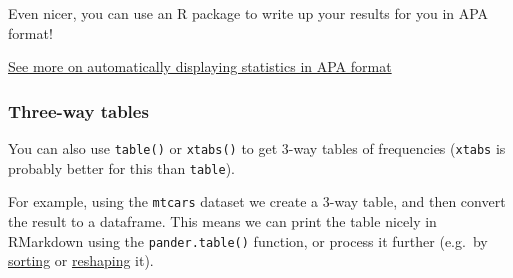 \documentclass[]{article}
\newenvironment{Shaded}{\begin{snugshade}}{\end{snugshade}}
\newcommand{\CharTok}[1]{\textcolor[rgb]{0.31,0.60,0.02}{#1}}
\newcommand{\DataTypeTok}[1]{\textcolor[rgb]{0.13,0.29,0.53}{#1}}
\newcommand{\DecValTok}[1]{\textcolor[rgb]{0.00,0.00,0.81}{#1}}
\newcommand{\KeywordTok}[1]{\textcolor[rgb]{0.13,0.29,0.53}{\textbf{#1}}}
\newcommand{\NormalTok}[1]{#1}
\newcommand{\OperatorTok}[1]{\textcolor[rgb]{0.81,0.36,0.00}{\textbf{#1}}}
\newcommand{\StringTok}[1]{\textcolor[rgb]{0.31,0.60,0.02}{#1}}
\begin{document}
Even nicer, you can use an R package to write up your results for you in APA
format!

\begin{Shaded}
\end{Shaded}

\protect\hyperlink{apa-output}{See more on automatically displaying statistics in APA format}

\hypertarget{three-way-tables}{%
\subsubsection*{Three-way tables}\label{three-way-tables}}

You can also use \texttt{table()} or \texttt{xtabs()} to get 3-way tables of frequencies
(\texttt{xtabs} is probably better for this than \texttt{table}).

For example, using the \texttt{mtcars} dataset we create a 3-way table, and then
convert the result to a dataframe. This means we can print the table nicely in
RMarkdown using the \texttt{pander.table()} function, or process it further (e.g.~by
\protect\hyperlink{sorting}{sorting} or \protect\hyperlink{reshaping}{reshaping} it).

\begin{Shaded}
\end{Shaded}
\end{document}
